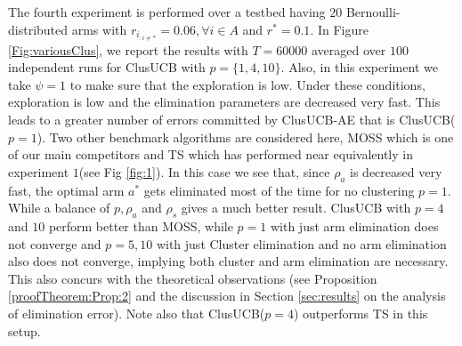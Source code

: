 	The fourth experiment is performed over a testbed having $20$ Bernoulli-distributed arms with $r_{i_{:{{i}\neq {*}}}}=0.06,\forall i\in A$ and $r^{*}=0.1$. In Figure \ref{Fig:variousClus}, we report the results with $T=60000$ averaged over $100$ independent runs for ClusUCB with  $p=\lbrace 1,4,10\rbrace$. Also, in this experiment we take $\psi = 1$ to make sure that the exploration is low. Under these conditions, exploration is low and the elimination parameters are decreased very fast. This leads to a greater number of errors committed by ClusUCB-AE that is ClusUCB($p=1$). Two other benchmark algorithms are considered here, MOSS which is one of our main competitors and TS which has performed near equivalently in experiment $1$(see Fig \ref{fig:1}). In this case we see that, since $\rho_{a}$ is decreased very fast, the optimal arm $a^{*}$ gets eliminated most of the time for no clustering $p=1$. While a balance of $p,\rho_{a}$ and $\rho_{s}$ gives a much better result. ClusUCB with $p=4$ and $10$ 
perform better than MOSS, while $p=1$ with just arm elimination does not converge and $p=5,10$ with just Cluster elimination and no arm elimination also does not converge, implying both cluster and arm elimination are necessary. This also concurs with the theoretical observations (see Proposition \ref{proofTheorem:Prop:2} and the discussion in Section \ref{sec:results} on the analysis of elimination error).
Note also that ClusUCB($p=4$) outperforms TS in this setup.	
	


